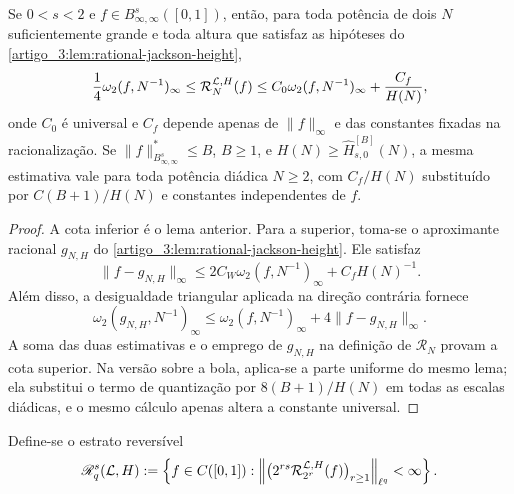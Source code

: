 \begin{theorem}\label{map:artigo_3:5.12}
\label{artigo_3:thm:regularized-jackson-bernstein}
Se $0<s<2$ e $f\in B^s_{\infty,\infty}([0,1])$, então, para toda potência de
dois $N$ suficientemente grande e toda altura que satisfaz as hipóteses do
\cref{artigo_3:lem:rational-jackson-height},
\begin{equation}
 \frac14\omega_2(f,N^{-1})_\infty
 \le \mathcal R_N^{\mathcal{L},H}(f)
 \le C_0\omega_2(f,N^{-1})_\infty+\frac{C_f}{H(N)},
 \label{artigo_3:eq:two-sided-regularized-equivalence}
\end{equation}
onde $C_0$ é universal e $C_f$ depende apenas de $\|f\|_\infty$ e das
constantes fixadas na racionalização.
Se $\|f\|_{B^s_{\infty,\infty}}^*\le B$, $B\ge1$, e
$H(N)\ge\widehat H_{s,0}^{[B]}(N)$, a mesma estimativa vale para toda potência
diádica $N\ge2$, com $C_f/H(N)$ substituído por $C(B+1)/H(N)$ e constantes
independentes de $f$.
\end{theorem}

\begin{proof}
A cota inferior é o lema anterior. Para a superior, toma-se o aproximante
racional $g_{N,H}$ do \cref{artigo_3:lem:rational-jackson-height}. Ele satisfaz
\[
 \|f-g_{N,H}\|_\infty
 \le2C_W\omega_2(f,N^{-1})_\infty+C_fH(N)^{-1}.
\]
Além disso, a desigualdade triangular aplicada na direção contrária fornece
\[
 \omega_2(g_{N,H},N^{-1})_\infty
 \le\omega_2(f,N^{-1})_\infty+4\|f-g_{N,H}\|_\infty.
\]
A soma das duas estimativas e o emprego de $g_{N,H}$ na definição de
$\mathcal R_N$ provam a cota superior. Na versão sobre a bola, aplica-se a parte
uniforme do mesmo lema; ela substitui o termo de quantização por
$8(B+1)/H(N)$ em todas as escalas diádicas, e o mesmo cálculo apenas altera a
constante universal.
\end{proof}

Define-se o estrato reversível
\begin{equation}
 \mathscr R_q^s(\mathcal{L},H)
 :=\left\{f\in C([0,1]):
 \left\|\bigl(2^{rs}\mathcal R_{2^r}^{\mathcal{L},H}(f)\bigr)_{r\ge1}
 \right\|_{\ell^q}<\infty\right\}.
 \label{artigo_3:eq:reversible-stratum}
\end{equation}


